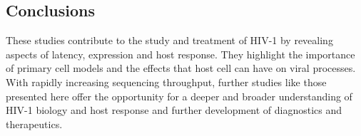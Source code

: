 \documentclass[../sherrill-Mix_thesis.tex]{subfiles}
\begin{document}
\subsection{Conclusions}
	These studies contribute to the study and treatment of HIV-1 by revealing aspects of latency, expression and host response. They highlight the importance of primary cell models and the effects that host cell can have on viral processes. With rapidly increasing sequencing throughput, further studies like those presented here offer the opportunity for a deeper and broader understanding of HIV-1 biology and host response and further development of diagnostics and therapeutics.
\end{document}
